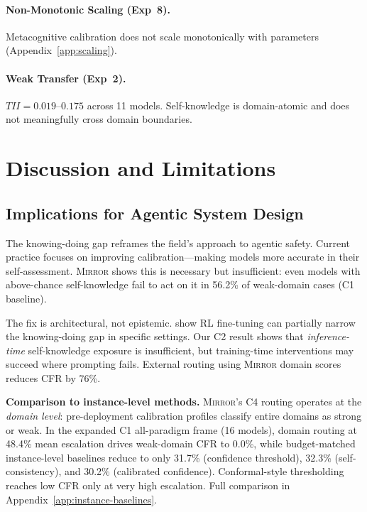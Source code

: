 \documentclass[10pt]{article}
\newcommand{\mirror}{\textsc{Mirror}}
\newcommand{\CFR}{CFR}
\newcommand{\TII}{TII}
\begin{document}
\paragraph{Non-Monotonic Scaling (Exp~8).}
Metacognitive calibration does not scale monotonically with parameters (Appendix~\ref{app:scaling}).

\paragraph{Weak Transfer (Exp~2).}
$\TII{} = 0.019$--$0.175$ across 11 models. Self-knowledge is domain-atomic and does not meaningfully cross domain boundaries.

\section{Discussion and Limitations}
\label{sec:discussion}

\subsection{Implications for Agentic System Design}

The knowing-doing gap reframes the field's approach to agentic safety. Current practice focuses on improving calibration---making models more accurate in their self-assessment. \mirror{} shows this is necessary but insufficient: even models with above-chance self-knowledge fail to act on it in 56.2\% of weak-domain cases (C1 baseline).

The fix is architectural, not epistemic. \citet{schmied2026greedy} show RL fine-tuning can partially narrow the knowing-doing gap in specific settings. Our C2 result shows that \emph{inference-time} self-knowledge exposure is insufficient, but training-time interventions may succeed where prompting fails. External routing using \mirror{} domain scores reduces \CFR{} by 76\%.

\textbf{Comparison to instance-level methods.} \mirror{}'s C4 routing operates at the \textit{domain level}: pre-deployment calibration profiles classify entire domains as strong or weak. In the expanded C1 all-paradigm frame (16 models), domain routing at 48.4\% mean escalation drives weak-domain CFR to 0.0\%, while budget-matched instance-level baselines reduce to only 31.7\% (confidence threshold), 32.3\% (self-consistency), and 30.2\% (calibrated confidence). Conformal-style thresholding reaches low CFR only at very high escalation. Full comparison in Appendix~\ref{app:instance-baselines}.
\end{document}
